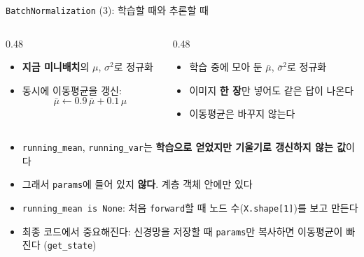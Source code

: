 \documentclass[aspectratio=169,11pt]{beamer}
\newcommand{\code}[1]{\texttt{#1}}
\begin{document}
\begin{frame}{\code{BatchNormalization} (3): 학습할 때와 추론할 때}
\begin{columns}[T,onlytextwidth]
\begin{column}{0.48\textwidth}
\begin{keybox}[학습 (\code{train\_flg=True})]
\small
\begin{itemize}
\item \textbf{지금 미니배치}의 $\mu$, $\sigma^2$로 정규화
\item 동시에 이동평균을 갱신:
\[
\bar\mu \leftarrow 0.9\,\bar\mu + 0.1\,\mu
\]
\end{itemize}
\end{keybox}
\end{column}
\begin{column}{0.48\textwidth}
\begin{keybox}[추론 (\code{train\_flg=False})]
\small
\begin{itemize}
\item 학습 중에 모아 둔 $\bar\mu$, $\bar\sigma^2$로 정규화
\item 이미지 \textbf{한 장}만 넣어도 같은 답이 나온다
\item 이동평균은 바꾸지 않는다
\end{itemize}
\end{keybox}
\end{column}
\end{columns}
\vskip2mm
\small
\begin{itemize}
\item \code{running\_mean}, \code{running\_var}는 \textbf{학습으로 얻었지만 기울기로 갱신하지 않는 값}이다
\item 그래서 \code{params}에 들어 있지 \textbf{않다}. 계층 객체 안에만 있다
\item \code{running\_mean is None}: 처음 \code{forward}할 때 노드 수(\code{X.shape[1]})를 보고 만든다
\item 최종 코드에서 중요해진다: 신경망을 저장할 때 \code{params}만 복사하면 이동평균이 빠진다 (\code{get\_state})
\end{itemize}
\end{frame}
\end{document}
